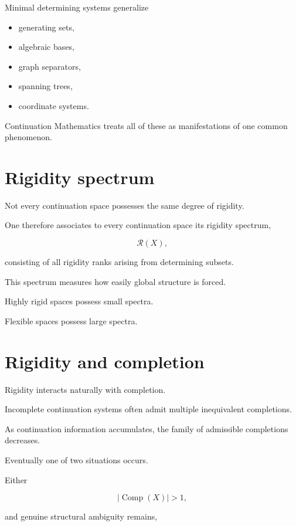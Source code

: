 \documentclass[13pt,openany]{book}
\theoremstyle{plain}
\theoremstyle{definition}
\begin{document}
Minimal determining systems generalize

\begin{itemize}
\item generating sets,
\item algebraic bases,
\item graph separators,
\item spanning trees,
\item coordinate systems.
\end{itemize}

Continuation Mathematics treats all of these as manifestations of one common phenomenon.


\section{Rigidity spectrum}

Not every continuation space possesses the same degree of rigidity.

One therefore associates to every continuation space its rigidity spectrum,

\[
\mathcal R(X),
\]

consisting of all rigidity ranks arising from determining subsets.

This spectrum measures how easily global structure is forced.

Highly rigid spaces possess small spectra.

Flexible spaces possess large spectra.


\section{Rigidity and completion}

Rigidity interacts naturally with completion.

Incomplete continuation systems often admit multiple inequivalent completions.

As continuation information accumulates,
the family of admissible completions decreases.

Eventually one of two situations occurs.

Either

\[
|\operatorname{Comp}(X)|>1,
\]

and genuine structural ambiguity remains,
\end{document}
